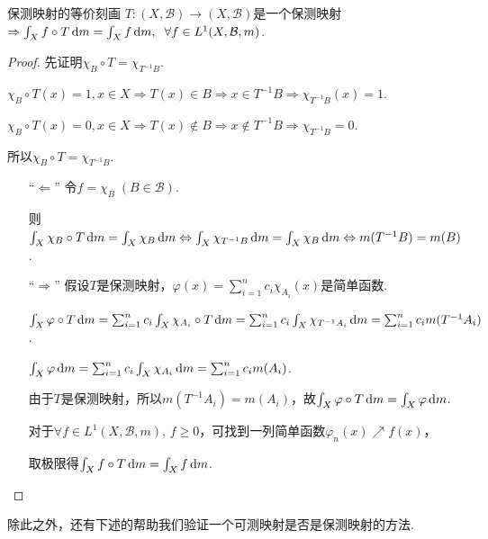 \begin{proposition}{保测映射的等价刻画}
    $T:(X,\mathcal{B}) \to (X,\mathcal{B})$是一个保测映射$\Rightarrow \int_X{f\circ T}\mathop{}\!\mathrm{d} m=\int_X{f}\mathop{}\!\mathrm{d} m, \;\; \forall f\in L^1(X,\mathcal{B},m)$.
\end{proposition}
\begin{proof}
    先证明$\chi_B\circ T=\chi_{T^{-1}B}$.\par
    $\chi_B\circ T(x)=1,x\in X \Rightarrow T(x)\in B \Rightarrow x\in T^{-1}B \Rightarrow \chi_{T^{-1}B}(x)=1$. \par
    $\chi_B\circ T(x)=0,x\in X \Rightarrow T(x)\notin B \Rightarrow x\notin T^{-1}B \Rightarrow \chi_{T^{-1}B}=0$.\par
    所以$\chi_B\circ T=\chi_{T^{-1}B}$.\par
    \begin{itemize}[leftmargin=3.5em]
        \item[“$\Leftarrow$”] 令$f=\chi_B\;(B\in\mathcal{B})$.\par
        则$\int_X{\chi_B\circ T}\mathop{}\!\mathrm{d} m=\int_X{\chi_B}\mathop{}\!\mathrm{d} m \Leftrightarrow \int_X{\chi_{T^{-1}B}}\mathop{}\!\mathrm{d} m=\int_X{\chi_B}\mathop{}\!\mathrm{d} m \Leftrightarrow m(T^{-1}B)=m(B)$.\par
        \item[“$\Rightarrow$”] 假设$T$是保测映射，$\varphi(x)=\sum_{i=1}^n{c_i\chi_{A_i}(x)}$是简单函数.\par
        $\int_X{\varphi\circ T}\mathop{}\!\mathrm{d} m = \sum_{i=1}^n{c_i\int_X{\chi_{A_i}\circ T}\mathop{}\!\mathrm{d} m} = \sum_{i=1}^n{c_i\int_X{\chi_{T^{-1}A_i}}\mathop{}\!\mathrm{d} m} = \sum_{i=1}^n{c_i m(T^{-1}A_i)}$.\par
        $\int_X{\varphi}\mathop{}\!\mathrm{d} m=\sum_{i=1}^n{c_i\int_X{\chi_{A_i}}\mathop{}\!\mathrm{d} m} =\sum_{i=1}^n{c_i m(A_i)}$.\par
        由于$T$是保测映射，所以$m(T^{-1}A_i)=m(A_i)$，故$\int_X{\varphi\circ T}\mathop{}\!\mathrm{d} m=\int_X{\varphi}\mathop{}\!\mathrm{d} m$.\par
        对于$\forall f\in L^1(X,\mathcal{B},m),\, f\geq 0$，可找到一列简单函数$\varphi_n(x)\nearrow f(x)$，\par
        取极限得$\int_X{f\circ T}\mathop{}\!\mathrm{d} m=\int_X{f}\mathop{}\!\mathrm{d} m$.
    \end{itemize}
\end{proof}

除此之外，还有下述的帮助我们验证一个可测映射是否是保测映射的方法.

